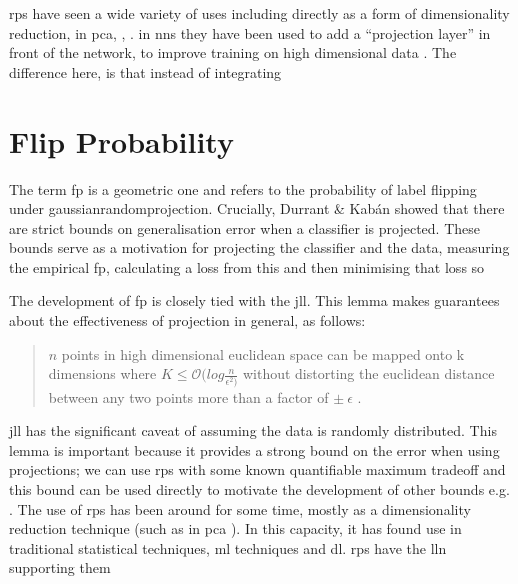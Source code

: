 

\gls{rp}s have seen a wide variety of uses \cite{random_project_uses} including directly as a form of dimensionality reduction, in \gls{pca},  %
, . in \gls{nn}s they have been used to add a \enquote{projection layer} in front of the network, to improve training on high dimensional data \cite{random_project_high_d}. The difference here, is that instead of integrating 

\section{Flip Probability}

The term \gls{fp} is a geometric one and refers to the probability of label flipping under \gls{gaussianrandomprojection}. Crucially, Durrant \& Kab\'an showed that there are strict bounds on generalisation error when a classifier is projected. These bounds serve as a motivation for projecting the classifier and the data, measuring the empirical \gls{fp}, calculating a loss from this and then minimising that loss so \cite{bob_sharp_generalisation_error_bounds}

The development of \gls{fp} is closely tied with the \gls{jll}. This lemma makes guarantees about the effectiveness of projection in general, as follows:

\begin{quote}
    $n$ points in high dimensional euclidean space can be mapped onto k dimensions where $K \leq \mathcal{O}(log \frac{n}{\epsilon^{2})} $ without distorting the euclidean distance between any two points more than a factor of $\pm \: \epsilon$ \cite{jll_notes}.
\end{quote}

\gls{jll} has the significant caveat of assuming the data is randomly distributed. This lemma is important because it provides a strong bound on the error when using projections; we can use \gls{rp}s with some known quantifiable maximum tradeoff and this bound can be used directly to motivate the development of other bounds e.g. \cite{bob_sharp_generalisation_error_bounds}.  The use of \gls{rp}s has been around for some time, mostly as a dimensionality reduction technique (such as in \gls{pca} ). In this capacity, it has found use in traditional statistical techniques, \gls{ml} techniques and \gls{dl}. \gls{rp}s have the \gls{lln} supporting them 

